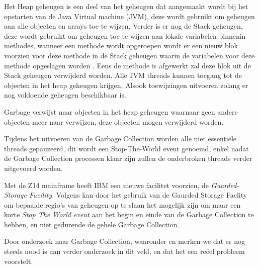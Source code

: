 Het Heap geheugen is een deel van het geheugen dat aangemaakt wordt bij het opstarten van de Java Virtual machine (JVM), deze wordt gebruikt om geheugen aan alle objecten en arrays toe te wijzen.
Verder is er nog de Stack geheugen, deze wordt gebruikt om geheugen toe te wijzen aan lokale variabelen binnenin methodes, wanneer een methode wordt opgeroepen wordt er een nieuw blok voorzien voor deze methode in de Stack geheugen waarin de variabelen voor deze methode opgeslagen worden \autocite{Cavanna2003}.
Eens de methode is afgewerkt zal deze blok uit de Stack geheugen verwijderd worden.
Alle JVM threads kunnen toegang tot de objecten in het heap geheugen krijgen, Alsook toewijzingen uitvoeren zolang er nog voldoende geheugen beschikbaar is. 

Garbage verwijst naar objecten in het heap geheugen waarnaar geen andere objecten meer naar verwijzen, deze objecten mogen verwijderd worden.

Tijdens het uitvoeren van de Garbage Collection worden alle niet essentiële threads gepauzeerd, dit wordt een Stop-The-World event genoemd, enkel nadat de Garbage Collection processen klaar zijn zullen de onderbroken threads verder uitgevoerd worden\autocite{Grgic2018}.

Met de Z14 mainframe heeft IBM een nieuwe facilitet voorzien, de \textit{Guarded-Storage Facility}.
Volgens \textcite{Gracie} kan door het gebruik van de Gaurded Storage Faclity om bepaalde regio's van geheugen op te slaan het mogelijk zijn om maar een korte \textit{Stop The World event} aan het begin en einde van de Garbage Collection te hebben, en niet gedurende de gehele Garbage Collection.

Door onderzoek naar Garbage Collection, waaronder \textcite{Bruno2018} en \textcite{Nguyen2016} merken we dat er nog steeds nood is aan verder onderzoek in dit veld, en dat het een reëel probleem voorstelt.






